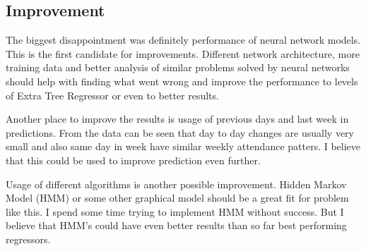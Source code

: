 \documentclass{article}
\begin{document}
\subsection{Improvement}
The biggest disappointment was definitely performance of neural network models. This is the first candidate for improvements. Different network architecture, more training data and better analysis of similar problems solved by neural networks should help with finding what went wrong and improve the performance to levels of Extra Tree Regressor or even to better results.

Another place to improve the results is usage of previous days and last week in predictions. From the data can be seen that day to day changes are usually very small and also same day in week have similar weekly attendance patters. I believe that this could be used to improve prediction even further. 

Usage of different algorithms is another possible improvement. Hidden Markov Model (HMM) or some other graphical model should be a great fit for problem like this. I spend some time trying to implement HMM without success. But I believe that HMM's could have even better results than so far best performing regressors.



\end{document}
